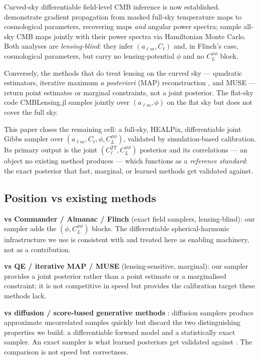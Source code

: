 \documentclass[twocolumn,superscriptaddress,aps,prl,floatfix]{revtex4-2}
\newcommand{\alm}{a_{\ell m}}
\newcommand{\cl}{C_\ell}
\newcommand{\clpp}{C_L^{\phi\phi}}
\begin{document}
Curved-sky differentiable field-level CMB inference is now established.
\citet{Flinch} demonstrate gradient propagation from masked full-sky temperature
maps to cosmological parameters, recovering maps \textit{and} angular power
spectra;
\citet{Almanac} sample all-sky CMB maps jointly with their power spectra via
Hamiltonian Monte Carlo.
Both analyses are \textit{lensing-blind}: they infer $(\alm, \cl)$ and, in
Flinch's case, cosmological parameters, but carry no lensing-potential $\phi$ and
no $\clpp$ block.

Conversely, the methods that do treat lensing on the curved sky — quadratic
estimators, iterative maximum \textit{a posteriori} (MAP) reconstruction
\citep{Carron:2017}, and MUSE \citep{MUSE} — return point estimates or marginal
constraints, not a joint posterior.
The flat-sky code CMBLensing.jl \citep{CMBLensing} samples jointly over
$(\alm, \phi)$ on the flat sky but does not cover the full sky.

This paper closes the remaining cell: a full-sky, HEALPix, differentiable joint
Gibbs sampler over $(\alm, \cl, \phi, \clpp)$, validated by
simulation-based calibration.
Its primary output is the joint $(\cl^{TT}, \clpp)$ posterior and its
correlations — an object no existing method produces — which functions as a
\textit{reference standard}: the exact posterior that fast, marginal, or learned
methods \citep{Doeser:2024} get validated against.

\subsection*{Position vs existing methods}

\textbf{vs Commander / Almanac / Flinch} (exact field samplers, lensing-blind):
our sampler adds the $(\phi, \clpp)$ blocks.
The differentiable spherical-harmonic infrastructure we use is consistent with
\citet{Flinch} and treated here as enabling machinery, not as a contribution.

\textbf{vs QE / iterative MAP / MUSE} (lensing-sensitive, marginal):
our sampler provides a joint posterior rather than a point estimate or a
marginalised constraint; it is not competitive in speed but provides
the calibration target these methods lack.

\textbf{vs diffusion / score-based generative methods} \citep{Drouin:2023}:
diffusion samplers produce approximate uncorrelated samples quickly but discard
the two distinguishing properties we build: a differentiable forward model and
a statistically exact sampler.
An exact sampler is what learned posteriors get validated against
\citep{Doeser:2024}.
The comparison is not speed but correctness.
\end{document}

